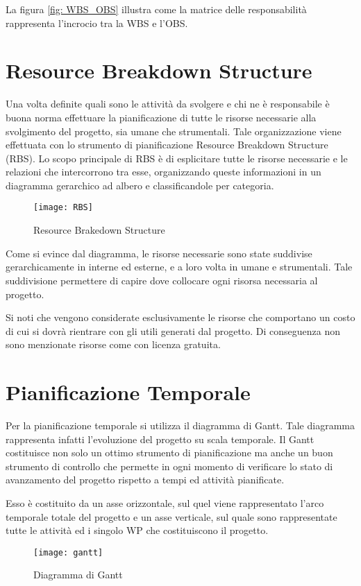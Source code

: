 La figura \ref{fig: WBS_OBS} illustra come la matrice delle responsabilità rappresenta l'incrocio tra la WBS e l'OBS.


\section{Resource Breakdown Structure}
Una volta definite quali sono le attività da svolgere e chi ne è responsabile è buona norma effettuare la pianificazione di tutte le risorse necessarie alla svolgimento del progetto, sia umane che strumentali.
Tale organizzazione viene effettuata con lo strumento di pianificazione Resource Breakdown Structure (RBS).
Lo scopo principale di RBS è di esplicitare tutte le risorse necessarie e le relazioni che intercorrono tra esse, organizzando queste informazioni in un diagramma gerarchico ad albero e classificandole per categoria.


\begin{figure}[!htb]
  \texttt{[image: RBS]}
  	\label{fig:RBS}
	\caption{Resource Brakedown Structure}
\end{figure}




Come si evince dal diagramma, le risorse necessarie sono state suddivise gerarchicamente in interne ed esterne, e a loro volta in umane e strumentali. Tale suddivisione permettere di capire dove collocare ogni risorsa necessaria al progetto.

Si noti che vengono considerate esclusivamente le risorse che comportano un costo di cui si dovrà rientrare con gli utili generati dal progetto. Di conseguenza non sono menzionate risorse come  con licenza gratuita.





\section{Pianificazione Temporale}
Per la pianificazione temporale si utilizza il diagramma di Gantt.
Tale diagramma rappresenta infatti l'evoluzione del progetto su scala temporale. Il Gantt costituisce non solo un ottimo strumento di pianificazione ma anche un buon strumento di controllo che permette in ogni momento di verificare lo stato di avanzamento del progetto rispetto a tempi ed attività pianificate.


Esso è costituito da un asse orizzontale, sul quel viene rappresentato l'arco temporale totale del progetto e un asse verticale, sul quale sono rappresentate tutte le attività ed i singolo WP che costituiscono il progetto.



\begin{figure}[!htb]
  \texttt{[image: gantt]}

  	
  	\label{fig:gantt}
	\caption{Diagramma di Gantt}
\end{figure}





